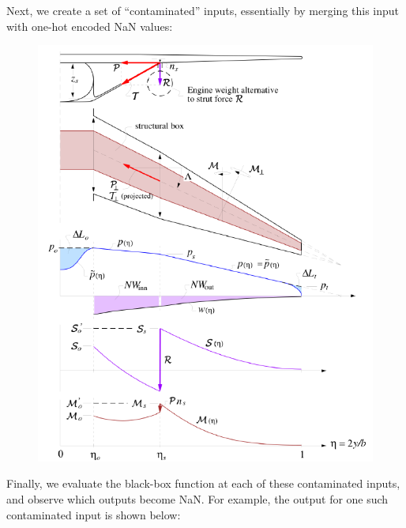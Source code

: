 Next, we create a set of ``contaminated'' inputs, essentially by merging this input with one-hot encoded NaN values:

\begin{figure}[H]
    \centering
    \includegraphics[page=3, width=5in]{../figures/nan-propagation/cropped.pdf}
\end{figure}

Finally, we evaluate the black-box function at each of these contaminated inputs, and observe which outputs become NaN. For example, the output for one such contaminated input is shown below:

